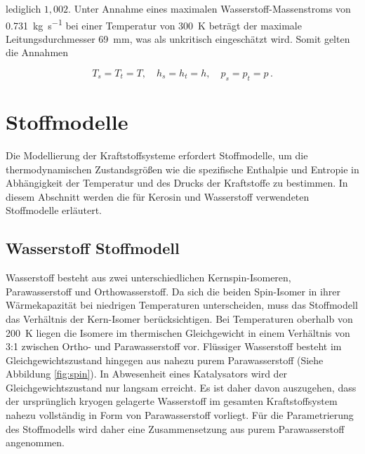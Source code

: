lediglich $1,002$. Unter Annahme eines maximalen Wasserstoff-Massenstroms von \SI{0.731}{\kg\per\s} bei einer Temperatur von \SI{300}{\K} beträgt der maximale Leitungsdurchmesser \SI{69}{\milli\m}, was als unkritisch eingeschätzt wird. Somit gelten die Annahmen

\begin{equation}\label{Eq:ts}
	T_s=T_t=T,\quad h_s=h_t=h,\quad p_s=p_t=p\,.
\end{equation}

\section{Stoffmodelle}

Die Modellierung der Kraftstoffsysteme erfordert Stoffmodelle, um die thermodynamischen Zustandsgrößen wie die spezifische Enthalpie und Entropie in Abhängigkeit der Temperatur und des Drucks der Kraftstoffe zu bestimmen. In diesem Abschnitt werden die für Kerosin und Wasserstoff verwendeten Stoffmodelle erläutert.

\subsection{Wasserstoff Stoffmodell}

Wasserstoff besteht aus zwei unterschiedlichen Kernspin-Isomeren, Parawasserstoff und Orthowasserstoff. Da sich die beiden Spin-Isomer in ihrer Wärmekapazität bei niedrigen Temperaturen unterscheiden, muss das Stoffmodell das Verhältnis der Kern-Isomer berücksichtigen. Bei Temperaturen oberhalb von \SI{200}{\K} liegen die Isomere im thermischen Gleichgewicht in einem Verhältnis von 3:1 zwischen Ortho- und Parawasserstoff vor. Flüssiger Wasserstoff besteht im Gleichgewichtszustand hingegen aus nahezu purem Parawasserstoff (Siehe Abbildung \ref{fig:spin}). In Abwesenheit eines Katalysators wird der Gleichgewichtszustand nur langsam erreicht. Es ist daher davon auszugehen, dass der ursprünglich kryogen gelagerte Wasserstoff im gesamten Kraftstoffsystem nahezu vollständig in Form von Parawasserstoff vorliegt. Für die Parametrierung des Stoffmodells wird daher eine Zusammensetzung aus purem Parawasserstoff angenommen. \cite{Buntkowsky.2022}

